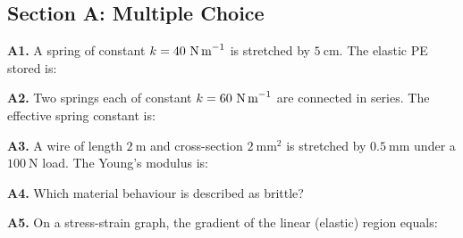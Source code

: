 \newpage
\begin{exercisebox}[9]

\subsection*{Section A: Multiple Choice}

\textbf{A1.} A spring of constant $k = 40\ \text{N\,m}^{-1}$
is stretched by $5\ \text{cm}$. The elastic PE stored is:


\vspace{0.4cm}

\textbf{A2.} Two springs each of constant
$k = 60\ \text{N\,m}^{-1}$ are connected in series.
The effective spring constant is:


\vspace{0.4cm}

\textbf{A3.} A wire of length $2\ \text{m}$ and
cross-section $2\ \text{mm}^2$ is stretched by
$0.5\ \text{mm}$ under a $100\ \text{N}$ load.
The Young's modulus is:


\vspace{0.4cm}

\textbf{A4.} Which material behaviour is described
as brittle?


\vspace{0.4cm}

\textbf{A5.} On a stress-strain graph, the gradient
of the linear (elastic) region equals:



\end{exercisebox}
